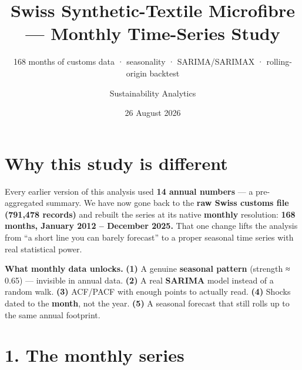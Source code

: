 \documentclass[
]{article}
\title{Swiss Synthetic-Textile Microfibre --- Monthly Time-Series Study}
\subtitle{168 months of customs data · seasonality · SARIMA/SARIMAX ·
rolling-origin backtest}
\author{Sustainability Analytics}
\date{26 August 2026}
\begin{document}
\maketitle

{
\setcounter{tocdepth}{2}
\tableofcontents
}
\section{Why this study is different}\label{why-this-study-is-different}

Every earlier version of this analysis used \textbf{14 annual numbers}
--- a pre-aggregated summary. We have now gone back to the \textbf{raw
Swiss customs file (791,478 records)} and rebuilt the series at its
native \textbf{monthly} resolution: \textbf{168 months, January 2012 --
December 2025.} That one change lifts the analysis from ``a short line
you can barely forecast'' to a proper seasonal time series with real
statistical power.

\textbf{What monthly data unlocks.} \textbf{(1)} A genuine
\textbf{seasonal pattern} (strength ≈ 0.65) --- invisible in annual
data. \textbf{(2)} A real \textbf{SARIMA} model instead of a random
walk. \textbf{(3)} ACF/PACF with enough points to actually read.
\textbf{(4)} Shocks dated to the \textbf{month}, not the year.
\textbf{(5)} A seasonal forecast that still rolls up to the same annual
footprint.

\section{1. The monthly series}\label{the-monthly-series}
\end{document}
